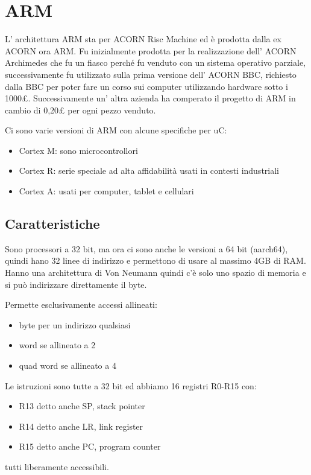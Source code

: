 \section{ARM}
L' architettura ARM sta per ACORN Risc Machine ed è prodotta dalla ex ACORN ora ARM.
Fu inizialmente prodotta per la realizzazione dell' ACORN Archimedes che fu un fiasco perché fu venduto con un sistema operativo parziale, successivamente fu utilizzato sulla prima versione dell' ACORN BBC, richiesto dalla BBC per poter fare un corso sui computer utilizzando hardware sotto i 1000£.
Successivamente un' altra azienda ha comperato il progetto di ARM in cambio di 0,20£ per ogni pezzo venduto.

Ci sono varie versioni di ARM con alcune specifiche per uC:
\begin{itemize}
    \item Cortex M: sono microcontrollori
    \item Cortex R: serie speciale ad alta affidabilità usati in contesti industriali
    \item Cortex A: usati per computer, tablet e cellulari
\end{itemize}

\subsection{Caratteristiche}
Sono processori a 32 bit, ma ora ci sono anche le versioni a 64 bit (aarch64), quindi hano 32 linee di indirizzo e permettono di usare al massimo 4GB di RAM.
Hanno una architettura di Von Neumann quindi c'è solo uno spazio di memoria e si può indirizzare direttamente il byte.

Permette esclusivamente accessi allineati:
\begin{itemize}
    \item byte per un indirizzo qualsiasi
    \item word se allineato a 2
    \item quad word se allineato a 4
\end{itemize}

Le istruzioni sono tutte a 32 bit ed abbiamo 16 registri R0-R15 con:
\begin{itemize}
    \item R13 detto anche SP, stack pointer
    \item R14 detto anche LR, link register
    \item R15 detto anche PC, program counter
\end{itemize}
tutti liberamente accessibili.

